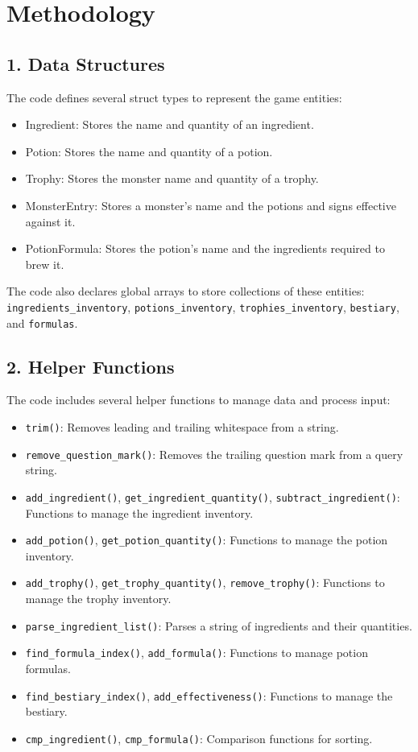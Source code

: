 \documentclass[12pt,a4paper]{article}
\begin{document}
\begin{verbatim}

\end{verbatim}

\section{Methodology}
\subsection*{1. Data Structures}
The code defines several struct types to represent the game entities:
\begin{itemize}
  \item Ingredient: Stores the name and quantity of an ingredient.
  \item Potion: Stores the name and quantity of a potion.
  \item Trophy: Stores the monster name and quantity of a trophy.
  \item MonsterEntry: Stores a monster's name and the potions and signs effective against it.
  \item PotionFormula: Stores the potion's name and the ingredients required to brew it.
\end{itemize}
The code also declares global arrays to store collections of these entities:
\texttt{ingredients\_inventory}, \texttt{potions\_inventory}, \texttt{trophies\_inventory}, \texttt{bestiary}, and \texttt{formulas}.

\subsection*{2. Helper Functions}
The code includes several helper functions to manage data and process input:
\begin{itemize}
  \item \texttt{trim()}: Removes leading and trailing whitespace from a string.
  \item \texttt{remove\_question\_mark()}: Removes the trailing question mark from a query string.
  \item \texttt{add\_ingredient()}, \texttt{get\_ingredient\_quantity()}, \texttt{subtract\_ingredient()}: Functions to manage the ingredient inventory.
  \item \texttt{add\_potion()}, \texttt{get\_potion\_quantity()}: Functions to manage the potion inventory.
  \item \texttt{add\_trophy()}, \texttt{get\_trophy\_quantity()}, \texttt{remove\_trophy()}: Functions to manage the trophy inventory.
  \item \texttt{parse\_ingredient\_list()}: Parses a string of ingredients and their quantities.
  \item \texttt{find\_formula\_index()}, \texttt{add\_formula()}: Functions to manage potion formulas.
  \item \texttt{find\_bestiary\_index()}, \texttt{add\_effectiveness()}: Functions to manage the bestiary.
  \item \texttt{cmp\_ingredient()}, \texttt{cmp\_formula()}: Comparison functions for sorting.
\end{itemize}
\end{document}
